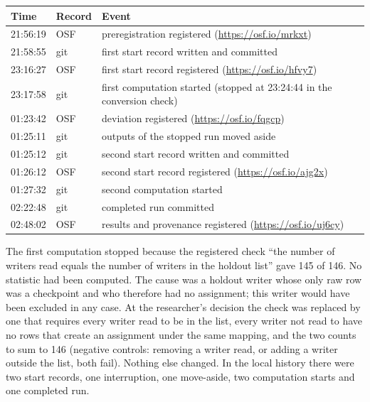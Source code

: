 \begin{center}\footnotesize
\begin{tabular}{l l l}
  \toprule
  Time & Record & Event \\
  \midrule
  21:56:19 & OSF & preregistration registered (\url{https://osf.io/mrkxt}) \\
  21:58:55 & git & first start record written and committed \\
  23:16:27 & OSF & first start record registered (\url{https://osf.io/hfvy7}) \\
  23:17:58 & git & first computation started (stopped at 23:24:44 in the conversion check) \\
  01:23:42 & OSF & deviation registered (\url{https://osf.io/fqgcp}) \\
  01:25:11 & git & outputs of the stopped run moved aside \\
  01:25:12 & git & second start record written and committed \\
  01:26:12 & OSF & second start record registered (\url{https://osf.io/ajg2x}) \\
  01:27:32 & git & second computation started \\
  02:22:48 & git & completed run committed \\
  02:48:02 & OSF & results and provenance registered (\url{https://osf.io/uj6cy}) \\
  \bottomrule
\end{tabular}
\end{center}

The first computation stopped because the registered check ``the number of writers read equals the number of writers
in the holdout list'' gave 145 of 146. No statistic had been computed. The cause was a holdout writer whose only raw
row was a checkpoint and who therefore had no assignment; this writer would have been excluded in any case. At the
researcher's decision the check was replaced by one that requires every writer read to be in the list, every writer not
read to have no rows that create an assignment under the same mapping, and the two counts to sum to 146 (negative
controls: removing a writer read, or adding a writer outside the list, both fail). Nothing else changed. In the local
history there were two start records, one interruption, one move-aside, two computation starts and one completed run.

